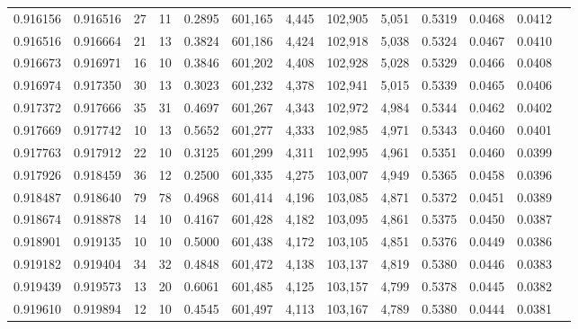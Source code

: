 \begin{tabular}{rrrrrrrrrrrrr}
0.916156 & 0.916516 &    27 &  11 &                                     0.2895 & 601,165 &   4,445 & 102,905 &   5,051 & 0.5319 & 0.0468 & 0.0412 \\
0.916516 & 0.916664 &    21 &  13 &                                     0.3824 & 601,186 &   4,424 & 102,918 &   5,038 & 0.5324 & 0.0467 & 0.0410 \\
0.916673 & 0.916971 &    16 &  10 &                                     0.3846 & 601,202 &   4,408 & 102,928 &   5,028 & 0.5329 & 0.0466 & 0.0408 \\
0.916974 & 0.917350 &    30 &  13 &                                     0.3023 & 601,232 &   4,378 & 102,941 &   5,015 & 0.5339 & 0.0465 & 0.0406 \\
0.917372 & 0.917666 &    35 &  31 &                                     0.4697 & 601,267 &   4,343 & 102,972 &   4,984 & 0.5344 & 0.0462 & 0.0402 \\
0.917669 & 0.917742 &    10 &  13 &                                     0.5652 & 601,277 &   4,333 & 102,985 &   4,971 & 0.5343 & 0.0460 & 0.0401 \\
0.917763 & 0.917912 &    22 &  10 &                                     0.3125 & 601,299 &   4,311 & 102,995 &   4,961 & 0.5351 & 0.0460 & 0.0399 \\
0.917926 & 0.918459 &    36 &  12 &                                     0.2500 & 601,335 &   4,275 & 103,007 &   4,949 & 0.5365 & 0.0458 & 0.0396 \\
0.918487 & 0.918640 &    79 &  78 &                                     0.4968 & 601,414 &   4,196 & 103,085 &   4,871 & 0.5372 & 0.0451 & 0.0389 \\
0.918674 & 0.918878 &    14 &  10 &                                     0.4167 & 601,428 &   4,182 & 103,095 &   4,861 & 0.5375 & 0.0450 & 0.0387 \\
0.918901 & 0.919135 &    10 &  10 &                                     0.5000 & 601,438 &   4,172 & 103,105 &   4,851 & 0.5376 & 0.0449 & 0.0386 \\
0.919182 & 0.919404 &    34 &  32 &                                     0.4848 & 601,472 &   4,138 & 103,137 &   4,819 & 0.5380 & 0.0446 & 0.0383 \\
0.919439 & 0.919573 &    13 &  20 &                                     0.6061 & 601,485 &   4,125 & 103,157 &   4,799 & 0.5378 & 0.0445 & 0.0382 \\
0.919610 & 0.919894 &    12 &  10 &                                     0.4545 & 601,497 &   4,113 & 103,167 &   4,789 & 0.5380 & 0.0444 & 0.0381 \\

\end{tabular}
